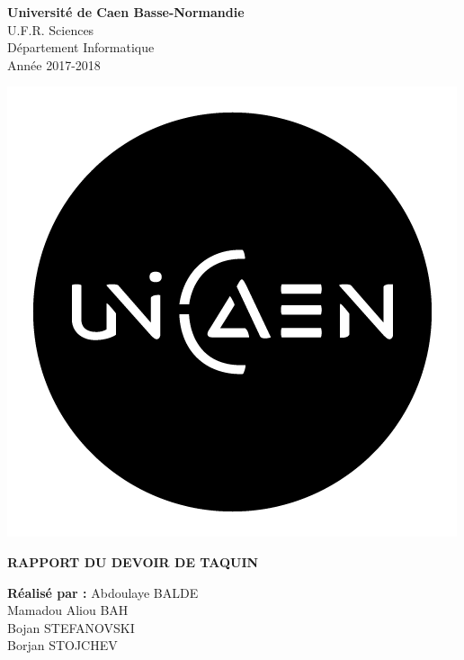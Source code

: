 \documentclass{report}
\begin{document}
\setcounter{page}{0} %
 
\begin{minipage}{0.6\linewidth} %
\textbf{Université de Caen Basse-Normandie}\\ 
U.F.R. Sciences \\
Département Informatique\\
Année 2017-2018
\end{minipage}
\begin{minipage}{0.5\linewidth}
\begin{flushright}
	\includegraphics[scale=0.1]{images/logo.png}
\end{flushright}
\end{minipage}
 
 
\vspace{8cm}
 
 
\begin{center}
\huge \textbf{RAPPORT DU DEVOIR DE TAQUIN }\\

\end{center}
 
 
\vspace{5cm}
 
 
\noindent %
\textbf{Réalisé par :} Abdoulaye BALDE  \\ Mamadou Aliou BAH  \\ Bojan STEFANOVSKI \\ Borjan STOJCHEV
\end{document}
